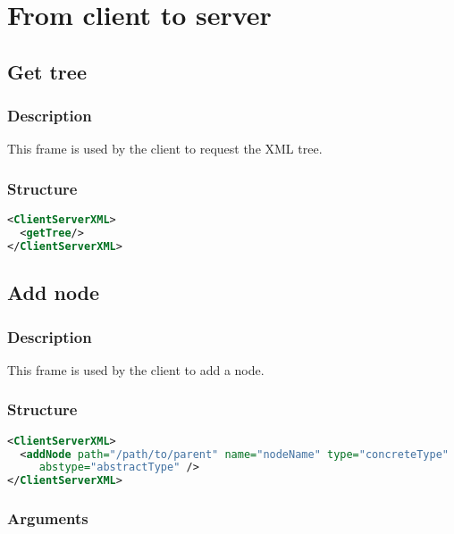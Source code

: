 \chapter{From client to server}

\section{Get tree}
\label{getTree}

\subsection{Description}

This frame is used by the client to request the XML tree.

\subsection{Structure}

\begin{lstlisting}[language=XML]
<ClientServerXML>
  <getTree/>
</ClientServerXML>
\end{lstlisting}


\section{Add node}
\label{addNode}

\subsection{Description}

This frame is used by the client to add a node. 

\subsection{Structure}

\begin{lstlisting}[language=XML]
<ClientServerXML>
  <addNode path="/path/to/parent" name="nodeName" type="concreteType" 
     abstype="abstractType" />
</ClientServerXML>
\end{lstlisting}

\subsection{Arguments}

